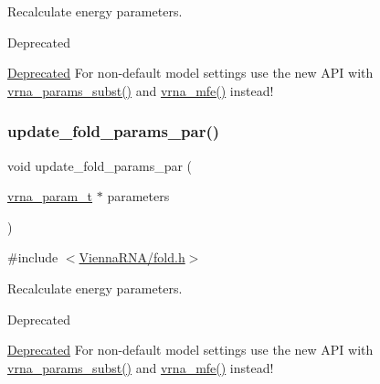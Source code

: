 Recalculate energy parameters. 

\begin{DoxyRefDesc}{Deprecated}
\item[\hyperlink{deprecated__deprecated000072}{Deprecated}]For non-\/default model settings use the new A\+PI with \hyperlink{group__energy__parameters_ga5d1909208f7ea3baa98b75afaa1f62ca}{vrna\+\_\+params\+\_\+subst()} and \hyperlink{group__mfe__fold_gabd3b147371ccf25c577f88bbbaf159fd}{vrna\+\_\+mfe()} instead!\end{DoxyRefDesc}
\mbox{\label{group__mfe__fold__single_gae66dc422efb8f5d56717d92d6002a9f8}} 
\subsubsection{\texorpdfstring{update\+\_\+fold\+\_\+params\+\_\+par()}{update\_fold\_params\_par()}}
{\footnotesize\ttfamily void update\+\_\+fold\+\_\+params\+\_\+par (\begin{DoxyParamCaption}\item[{\hyperlink{group__energy__parameters_ga8a69ca7d787e4fd6079914f5343a1f35}{vrna\+\_\+param\+\_\+t} $\ast$}]{parameters }\end{DoxyParamCaption})}



{\ttfamily \#include $<$\hyperlink{fold_8h}{Vienna\+R\+N\+A/fold.\+h}$>$}



Recalculate energy parameters. 

\begin{DoxyRefDesc}{Deprecated}
\item[\hyperlink{deprecated__deprecated000073}{Deprecated}]For non-\/default model settings use the new A\+PI with \hyperlink{group__energy__parameters_ga5d1909208f7ea3baa98b75afaa1f62ca}{vrna\+\_\+params\+\_\+subst()} and \hyperlink{group__mfe__fold_gabd3b147371ccf25c577f88bbbaf159fd}{vrna\+\_\+mfe()} instead!\end{DoxyRefDesc}
\mbox{\label{group__mfe__fold__single_ga99641b8dbb40891da5490d3cc271e607}} 
